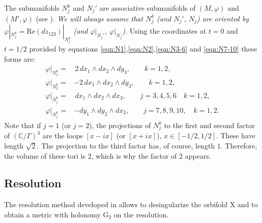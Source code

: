\documentclass[10pt]{article}
\newcommand{\C}{\mathbb C}
\newcommand{\Gtwo}{\mathrm{G}_2}
\newcommand{\re}{\mathrm{Re}}
\theoremstyle{plain}
\theoremstyle{definition}
\theoremstyle{remark}
\begin{document}
 The submanifolds $N_j^k$ and $N_j'$ are associative submanifolds of $(M,\varphi)$ and $(M',\varphi)$ (see \cite[Proposition 2.13]{JK}).
\emph { We will always assume that $N_j^k$ (and $N_j'$, $N_j$) are oriented by $\varphi|_{N_j^k}=\re(dz_{123})|_{N_j^k}$ (and $\varphi|_{N_j'}$, $\varphi|_{N_j}$).}
Using the coordinates at $t=0$ and $t=1/2$ provided by equations \eqref{eqn:N1},\eqref{eqn:N2},\eqref{eqn:N3-6} and \eqref{eqn:N7-10} these forms are:
\begin{align}
\varphi|_{N_1^k}=&\, 2\, dx_1\wedge dx_2 \wedge dy_3, \qquad k=1,2, \label{eqn:or-1} \\
\varphi|_{N_2^k}=& -2\, dx_1\wedge dx_2 \wedge dy_3, \qquad k=1,2, \label{eqn:or-2} \\
\varphi|_{N_j^k}=&\,dx_1\wedge dx_2 \wedge dx_3, \qquad j=3,4,5,6 \quad k=1,2, \label{eqn:or-3-6} \\
\varphi|_{N_j^k}=&-dy_1\wedge dy_2 \wedge dx_3, \qquad j=7,8,9,10, \quad k=1,2. \label{eqn:or-7-10}
\end{align}
 Note that if $j=1$ (or $j=2$), the projections of $N_j^k$ to the first and second factor of $(\C/\Gamma)^3$ are the loops $[x-ix]$ (or $[x+ix]$), $x\in [-1/2,1/2]$. These have length $\sqrt{2}$. The projection to the third factor has, of course, length $1$. Therefore, the volume of these tori is $2$, which is why the factor of $2$ appears.



\subsection{Resolution} \label{sec:resolution}

The resolution method developed in \cite{JK} allows to desingularize the orbifold X and to obtain a metric
with holonomy $\Gtwo$ on the resolution. 
\end{document}

